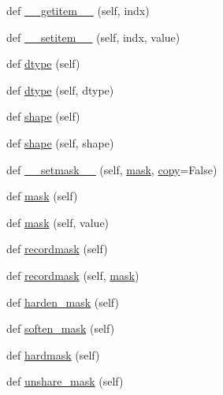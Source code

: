 \begin{DoxyCompactItemize}
def \hyperlink{classnumpy_1_1ma_1_1core_1_1MaskedArray_aca9ec13cd579342dc2910abbde1e2e1f}{\+\_\+\+\_\+getitem\+\_\+\+\_\+} (self, indx)
\item 
def \hyperlink{classnumpy_1_1ma_1_1core_1_1MaskedArray_a6a34f3c6b2930a40aa280cacb54c27f3}{\+\_\+\+\_\+setitem\+\_\+\+\_\+} (self, indx, value)
\item 
def \hyperlink{classnumpy_1_1ma_1_1core_1_1MaskedArray_a62214235f0aab03fccf5cb2988601eba}{dtype} (self)
\item 
def \hyperlink{classnumpy_1_1ma_1_1core_1_1MaskedArray_a31dbda994edd5cd739b52fbcf857b7c2}{dtype} (self, dtype)
\item 
def \hyperlink{classnumpy_1_1ma_1_1core_1_1MaskedArray_a87383f74cb220d0480cb83f44ffe8ac6}{shape} (self)
\item 
def \hyperlink{classnumpy_1_1ma_1_1core_1_1MaskedArray_aca455ab54ed61916f92e1ebb93aca2d5}{shape} (self, shape)
\item 
def \hyperlink{classnumpy_1_1ma_1_1core_1_1MaskedArray_a0469a713db74471a8865eabcb8da0b58}{\+\_\+\+\_\+setmask\+\_\+\+\_\+} (self, \hyperlink{classnumpy_1_1ma_1_1core_1_1MaskedArray_a7ef4d822649ddda22965ba79c54e0afc}{mask}, \hyperlink{classnumpy_1_1ma_1_1core_1_1MaskedArray_a2d8023d4e0400e07cbffbc8a60e0a418}{copy}=False)
\item 
def \hyperlink{classnumpy_1_1ma_1_1core_1_1MaskedArray_a7ef4d822649ddda22965ba79c54e0afc}{mask} (self)
\item 
def \hyperlink{classnumpy_1_1ma_1_1core_1_1MaskedArray_aed2a5508c132dc54a196c4b9a0cfc95d}{mask} (self, value)
\item 
def \hyperlink{classnumpy_1_1ma_1_1core_1_1MaskedArray_ae5c1c17c660a3508d0e21d926af7584c}{recordmask} (self)
\item 
def \hyperlink{classnumpy_1_1ma_1_1core_1_1MaskedArray_a534a10c03cf537ef6d7b2b52bfa6eb47}{recordmask} (self, \hyperlink{classnumpy_1_1ma_1_1core_1_1MaskedArray_a7ef4d822649ddda22965ba79c54e0afc}{mask})
\item 
def \hyperlink{classnumpy_1_1ma_1_1core_1_1MaskedArray_ab2fbfb0f77ec499b46842d4acbf3d01e}{harden\+\_\+mask} (self)
\item 
def \hyperlink{classnumpy_1_1ma_1_1core_1_1MaskedArray_ac047bfe654e0211a85f30f4072b819fa}{soften\+\_\+mask} (self)
\item 
def \hyperlink{classnumpy_1_1ma_1_1core_1_1MaskedArray_a673554fc5a945048b3caa282d191072e}{hardmask} (self)
\item 
def \hyperlink{classnumpy_1_1ma_1_1core_1_1MaskedArray_a642e4716a125d72052d8d44b4fb72e5d}{unshare\+\_\+mask} (self)

\end{DoxyCompactItemize}
